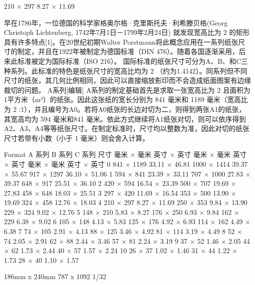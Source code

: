\documentclass[main.tex]{subfiles}
\begin{document}
210 × 297	8.27 × 11.69

早在1786年，一位德国的科学家格奥尔格·克里斯托夫·利希滕贝格(Georg Christoph Lichtenberg, 1742年7月1日－1799年2月24日) 就发现宽高比为
2
的矩形具有许多特点[1]。在20世纪初期Walter Porstmann将此概念应用在一系列纸张尺寸的制定，并且在1922年被制定为德国标准（DIN 476）。随着各国逐渐采用，后来此标准被定为国际标准（ISO 216）。
国际标准的纸张尺寸可分为A、B、和C三种系列。此标准的特色是纸张尺寸的宽高比均为
2
（约为1.4142）。同系列但不同尺寸的纸张，其几何比例相同，因此可以直接缩放影印而不会造成纸面图案有边缘裁切的问题。
A系列[编辑]
A系列的制定基础首先是求取一张宽高比为
2
且面积为1平方米（m²）的纸张。因此这张纸的宽长分别为 841 毫米和 1189 毫米（宽高比为
2
:1），并且编号为A0。若将A0纸张的长边对切为二，则得到两张A1的纸张，其宽高均为 594 毫米和841 毫米。依此方式继续将A1纸张对切，则可以依序得到A2、A3、A4等等纸张尺寸。在制定标准时，尺寸均以整数为准，因此对切的纸张尺寸若带有小数（小于 1 毫米）则会舍入计算。

Format	A 系列	B 系列	C 系列
尺寸	毫米 × 毫米	英寸 × 英寸	毫米 × 毫米	英寸 × 英寸	毫米 × 毫米	英寸 × 英寸
0	841 × 1189	33.11 × 46.81	1000 × 1414	39.37 × 55.67	917 × 1297	36.10 × 51.06
1	594 × 841	23.39 × 33.11	707 × 1000	27.83 × 39.37	648 × 917	25.51 × 36.10
2	420 × 594	16.54 × 23.39	500 × 707	19.69 × 27.83	458 × 648	18.03 × 25.51
3	297 × 420	11.69 × 16.54	353 × 500	13.90 × 19.69	324 × 458	12.76 × 18.03
4	210 × 297	8.27 × 11.69	250 × 353	9.84 × 13.90	229 × 324	9.02 × 12.76
5	148 × 210	5.83 × 8.27	176 × 250	6.93 × 9.84	162 × 229	6.38 × 9.02
6	105 × 148	4.13 × 5.83	125 × 176	4.92 × 6.93	114 × 162	4.49 × 6.38
7	74 × 105	2.91 × 4.13	88 × 125	3.46 × 4.92	81 × 114	3.19 × 4.49
8	52 × 74	2.05 × 2.91	62 × 88	2.44 × 3.46	57 × 81	2.24 × 3.19
9	37 × 52	1.46 × 2.05	44 × 62	1.73 × 2.44	40 × 57	1.57 × 2.24
10	26 × 37	1.02 × 1.46	31 × 44	1.22 × 1.73	28 × 40	1.10 × 1.57


186mm x 240mm
787 x 1092 1/32 
\newpage
\end{document}
